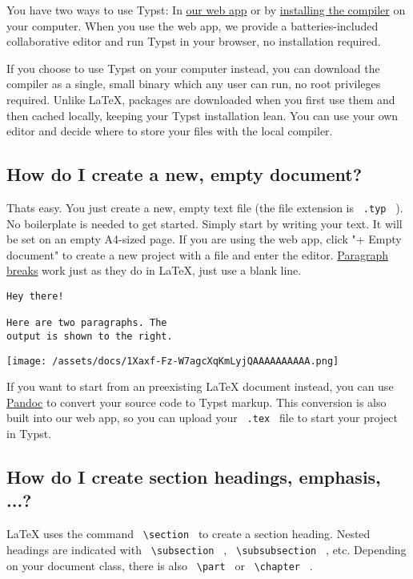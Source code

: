 You have two ways to use Typst: In \href{https://typst.app/signup/}{our
web app} or by \href{https://github.com/typst/typst/releases}{installing
the compiler} on your computer. When you use the web app, we provide a
batteries-included collaborative editor and run Typst in your browser,
no installation required.

If you choose to use Typst on your computer instead, you can download
the compiler as a single, small binary which any user can run, no root
privileges required. Unlike LaTeX, packages are downloaded when you
first use them and then cached locally, keeping your Typst installation
lean. You can use your own editor and decide where to store your files
with the local compiler.

\subsection{How do I create a new, empty
document?}\label{getting-started}

That\textquotesingle s easy. You just create a new, empty text file (the
file extension is \texttt{\ .typ\ } ). No boilerplate is needed to get
started. Simply start by writing your text. It will be set on an empty
A4-sized page. If you are using the web app, click "+ Empty document" to
create a new project with a file and enter the editor.
\href{/docs/reference/model/parbreak/}{Paragraph breaks} work just as
they do in LaTeX, just use a blank line.

\begin{verbatim}
Hey there!

Here are two paragraphs. The
output is shown to the right.
\end{verbatim}

\texttt{[image: /assets/docs/1Xaxf-Fz-W7agcXqKmLyjQAAAAAAAAAA.png]}

If you want to start from an preexisting LaTeX document instead, you can
use \href{https://pandoc.org}{Pandoc} to convert your source code to
Typst markup. This conversion is also built into our web app, so you can
upload your \texttt{\ .tex\ } file to start your project in Typst.

\subsection{How do I create section headings, emphasis,
...?}\label{elements}

LaTeX uses the command \texttt{\ \textbackslash{}section\ } to create a
section heading. Nested headings are indicated with
\texttt{\ \textbackslash{}subsection\ } ,
\texttt{\ \textbackslash{}subsubsection\ } , etc. Depending on your
document class, there is also \texttt{\ \textbackslash{}part\ } or
\texttt{\ \textbackslash{}chapter\ } .

